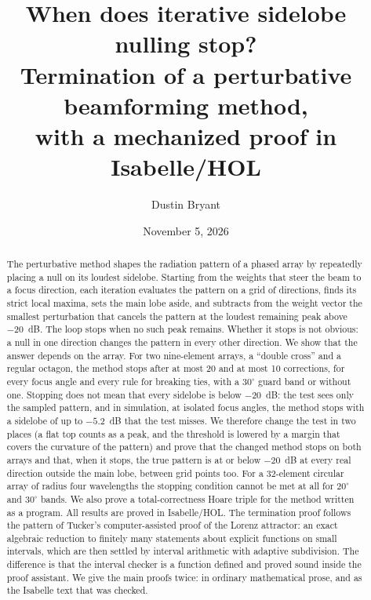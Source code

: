 \documentclass[11pt]{amsart}
\theoremstyle{plain}
\theoremstyle{definition}
\begin{document}
\setlength{\emergencystretch}{3em}

\title[Termination of a perturbative sidelobe-nulling method]{When does iterative sidelobe nulling stop?\\
Termination of a perturbative beamforming method,\\ with a mechanized proof in Isabelle/HOL}
\author{Dustin Bryant}
\address{Independent researcher, USA}
\date{November 5, 2026}

\begin{abstract}
The perturbative method shapes the radiation pattern of a phased array by repeatedly placing a
null on its loudest sidelobe.  Starting from the weights that steer the beam to a focus
direction, each iteration evaluates the pattern on a grid of directions, finds its strict local
maxima, sets the main lobe aside, and subtracts from the weight vector the smallest perturbation
that cancels the pattern at the loudest remaining peak above $-20$~dB.  The loop stops when no
such peak remains.  Whether it stops is not obvious: a null in one direction changes the pattern
in every other direction.  We show that the answer depends on the array.  For two nine-element
arrays, a ``double cross'' and a regular octagon, the method stops after at most 20 and at most 10
corrections, for every focus angle and every rule for breaking ties, with a $30^\circ$ guard band or
without one.  Stopping does not mean that every sidelobe is below $-20$~dB: the test sees only the
sampled pattern, and in simulation, at isolated focus angles, the method stops with a sidelobe of up
to $-5.2$~dB that the test misses.  We therefore change the test in two places (a flat top counts
as a peak, and the threshold is lowered by a margin that covers the curvature of the pattern) and
prove that the changed method stops on both arrays and that, when it stops, the true pattern is at or
below $-20$~dB at every real direction outside the main lobe, between grid points too.  For a 32-element
circular array of radius four wavelengths the stopping condition cannot be met at all for
$20^\circ$ and $30^\circ$ bands.  We also prove a total-correctness Hoare triple for the method
written as a program.  All results are proved in Isabelle/HOL.  The termination proof follows the
pattern of Tucker's computer-assisted proof of the Lorenz attractor: an exact algebraic reduction
to finitely many statements about explicit functions on small intervals, which are then settled by
interval arithmetic with adaptive subdivision.  The difference is that the interval checker is a
function defined and proved sound inside the proof assistant.  We give the main proofs twice: in
ordinary mathematical prose, and as the Isabelle text that was checked.
\end{abstract}
\end{document}
